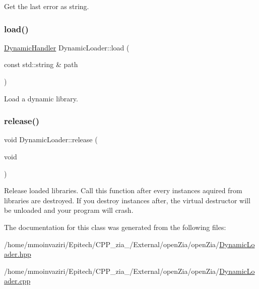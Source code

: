 Get the last error as string. 

\mbox{\label{classo_z_1_1_dynamic_loader_a1a0201ebc77bdd744aa528d7cb999a89}} 
\subsubsection{\texorpdfstring{load()}{load()}}
{\footnotesize\ttfamily \mbox{\hyperlink{namespaceo_z_acbfabf71824b5fc6a3beb64e397afc19}{Dynamic\+Handler}} Dynamic\+Loader\+::load (\begin{DoxyParamCaption}\item[{const std\+::string \&}]{path }\end{DoxyParamCaption})}



Load a dynamic library. 

\mbox{\label{classo_z_1_1_dynamic_loader_a405559cdad1b8eba0bd3bee22fa764f9}} 
\subsubsection{\texorpdfstring{release()}{release()}}
{\footnotesize\ttfamily void Dynamic\+Loader\+::release (\begin{DoxyParamCaption}\item[{void}]{ }\end{DoxyParamCaption})}



Release loaded libraries. Call this function after every instances aquired from libraries are destroyed. If you destroy instances after, the virtual destructor will be unloaded and your program will crash. 



The documentation for this class was generated from the following files\+:\begin{DoxyCompactItemize}
\item 
/home/mmoinvaziri/\+Epitech/\+C\+P\+P\+\_\+zia\+\_/\+External/open\+Zia/open\+Zia/\mbox{\hyperlink{_dynamic_loader_8hpp}{Dynamic\+Loader.\+hpp}}\item 
/home/mmoinvaziri/\+Epitech/\+C\+P\+P\+\_\+zia\+\_/\+External/open\+Zia/open\+Zia/\mbox{\hyperlink{_dynamic_loader_8cpp}{Dynamic\+Loader.\+cpp}}\end{DoxyCompactItemize}
